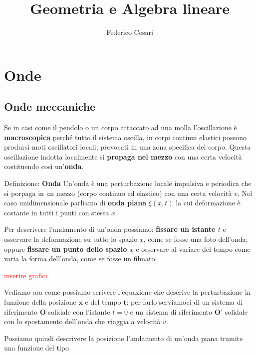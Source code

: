 \documentclass[x11names]{report}
\title{Geometria e Algebra lineare}
\author{Federico Cesari}
\date{}
\begin{document}
	

\tableofcontents
\newpage

\chapter{Onde}
\section{Onde meccaniche}
	Se in casi come il pendolo o un corpo attaccato ad una molla l'oscillazione è \textbf{macroscopica} perché tutto il sistema oscilla, in corpi continui elastici possono prodursi moti oscillatori locali, provocati in una zona specifica del corpo. Questa oscillazione indotta localmente si \textbf{propaga nel mezzo} con una certa velocità costituendo così un'\textbf{onda}.
	
	\begin{center}
		\colorbox{yblue}{\begin{minipage}{5.75in}
				\begin{blues}{Definizione: \textbf{Onda}}
					Un'onda è una perturbazione locale impulsiva e periodica che si porpaga in un mezzo (corpo continuo ed elastico) con una certa velocità \(v\). Nel caso unidimensionale parliamo di \textbf{onda piana} \(\xi(x,t)\) la cui deformazione è costante in tutti i punti con stessa \(x\)
				\end{blues}
		\end{minipage}}
	\end{center}
	
	Per descrivere l'andamento di un'onda possiamo: \textbf{fissare un istante \(t\)} e osservare la deformazione su tutto lo spazio \(x\), come se fosse una foto dell'onda; oppure \textbf{fissare un punto dello spazio \(x\)} e osservare al variare del tempo come varia la forma dell'onda, come se fosse un filmato.
	
	\begin{center}
		\textcolor{red}{inserire grafici}
	\end{center}
	
	Vediamo ora come possiamo scrivere l'equazione che descrive la perturbazione in funzione della posizione \(\mathbf{x}\) e del tempo \(\mathbf{t}\): per farlo serviamoci di un sistema di riferimento \(\mathbf{O}\) solidale con l'istante \(t=0\) e un sistema di riferimento \(\mathbf{O'}\) solidale con lo spostamento dell'onda che viaggia a velocità \(v\).
	
	Possiamo quindi descrivere la posizione l'andamento di un'onda piana tramite una funzione del tipo
	
\end{document}
